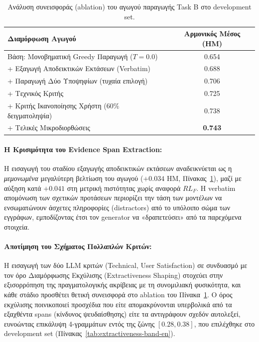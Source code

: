 \begin{table}[ht]
\centering
\small
\begin{tabular}{lc}
\toprule
\textbf{Διαμόρφωση Αγωγού} & \textbf{Αρμονικός Μέσος (HM)} \\
\midrule
Βάση: Μονοβηματική Greedy Παραγωγή ($T{=}0.0$) & 0.654 \\
+ Εξαγωγή Αποδεικτικών Εκτάσεων (Verbatim) & 0.688 \\
+ Παραγωγή Δύο Υποψηφίων (τυχαία επιλογή) & 0.706 \\
+ Τεχνικός Κριτής & 0.725 \\
+ Κριτής Ικανοποίησης Χρήστη ($60\%$ δειγματοληψία) & 0.738 \\
+ Τελικές Μικροδιορθώσεις & \textbf{0.743} \\
\bottomrule
\end{tabular}
\caption{Ανάλυση συνεισφοράς (ablation) του αγωγού παραγωγής Task B στο development set.}
\label{tab:gen-ablation-greek}
\end{table}

\paragraph{Η Κρισιμότητα του Evidence Span Extraction:}
Η εισαγωγή του σταδίου εξαγωγής αποδεικτικών εκτάσεων αναδεικνύεται ως η \textit{μεμονωμένα} μεγαλύτερη βελτίωση του αγωγού ($+0.034$ HM, Πίνακας~\ref{tab:gen-ablation-greek}), μαζί με αύξηση κατά $+0.041$ στη μετρική πιστότητας χωρίς αναφορά $RL_F$. Η verbatim απομόνωση των σχετικών προτάσεων περιορίζει την τάση των μοντέλων να ενσωματώνουν άσχετες πληροφορίες (distractors) από το υπόλοιπο σώμα των εγγράφων, εμποδίζοντας έτσι τον generator να «δραπετεύσει» από τα παρεχόμενα στοιχεία.

\paragraph{Αποτίμηση του Σχήματος Πολλαπλών Κριτών:}
Η εισαγωγή των δύο LLM κριτών (Technical, User Satisfaction) σε συνδυασμό με τον όρο Διαμόρφωσης Εκχύλισης (Extractiveness Shaping) στοχεύει στην εξισορρόπηση της πραγματολογικής ακρίβειας με τη συνομιλιακή φυσικότητα, και κάθε στάδιο προσθέτει θετική συνεισφορά στο ablation του Πίνακα~\ref{tab:gen-ablation-greek}. Ο όρος εκχύλισης ποινικοποιεί προσχέδια που είτε απομακρύνονται υπερβολικά από τα εξαχθέντα spans (κίνδυνος ψευδαίσθησης) είτε τα αντιγράφουν σχεδόν αυτολεξεί, ευνοώντας επικάλυψη 4-γραμμάτων εντός της ζώνης $[0.28, 0.38]$, που επιλέχθηκε στο development set (Πίνακας~\ref{tab:extractiveness-band-en}).

